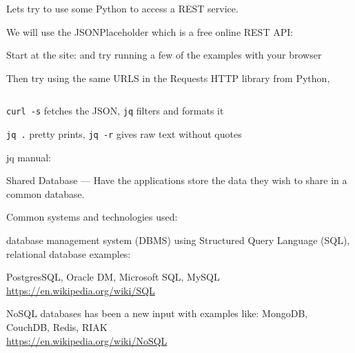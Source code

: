 \documentclass[Screen16to9,17pt]{foils}
\begin{document}
\inputminted{python}{programs/rest-1.py}

\begin{list2}
\item  Lets try to use some Python to access a REST service.
\item  We will use the JSONPlaceholder which is a free online REST API:
\item Start at the site:  and try running a few of the examples with your browser
\item Then try using the same URLS in the Requests HTTP library from Python,\\
\end{list2}


\inputminted{bash}{programs/rest-jq.sh}

\begin{list2}
\item \verb+curl -s+ fetches the JSON, \verb+jq+ filters and formats it
\item \verb+jq .+ pretty prints, \verb+jq -r+ gives raw text without quotes
\item jq manual: 
\end{list2}



Shared Database — Have the applications store the data they wish to share in a common database.

Common systems and technologies used:
\begin{list2}
\item database management system (DBMS) using Structured Query Language (SQL), relational database examples:\\
\item PostgresSQL, Oracle DM, Microsoft SQL, MySQL
\url{https://en.wikipedia.org/wiki/SQL}
\item NoSQL databases has been a new input with examples like:
MongoDB, CouchDB, Redis, RIAK\\
\url{https://en.wikipedia.org/wiki/NoSQL}
\end{list2}
\end{document}

